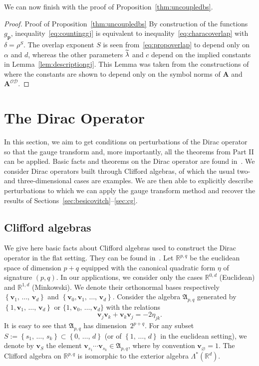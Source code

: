 \documentclass[10pt]{amsart}
\theoremstyle{definition}\newtheorem{defi}[theo]{Definition}\newtheorem{rema}[theo]{Remark}\newtheorem{exam}[theo]{Example}\newtheorem{nota}[theo]{Notation}
\newcommand{\R}{\mathbb R}
\newcommand{\CD}{\mathcal{D}}
\newcommand{\CO}{\mathcal{O}}
\newcommand{\BA}{\mathbf A}
\newcommand{\bp}{\mathbf p}
\newcommand{\bv}{\mathbf v}
\newcommand{\FA}{\mathfrak A}
\newcommand{\set}[1]{\left\{ #1 \right\}}
\let\oldtilde\tilde
\renewcommand*{\tilde}[1]{\mathchoice{\widetilde{#1}}{\widetilde{#1}}{\oldtilde{#1}}{\oldtilde{#1}}}
\begin{document}
We can now finish with the proof of Proposition~\ref{thm:uncoupledbs}.

\begin{proof}
{Proof of Proposition~\ref{thm:uncoupledbs}}
By construction of the functions $g_\bp$, inequality~\eqref{eq:countinggj} is equivalent to inequality~\eqref{eq:characoverlap} with $\delta = \rho^S$. The overlap exponent $S$ is seen from~\eqref{eq:propoverlap} to depend only on $\alpha$ and $d$, whereas the other parameters $\tilde \lambda$ and $c$ depend on the implied constants in Lemma~\ref{lem:descriptiongj}. This Lemma was taken from the constructions of~\cite[Section~7]{ParSob2010} where the constants are shown to depend only on the symbol norms of $\BA$ and $\BA^{\CO\CD}$.
\end{proof}



\section{The Dirac Operator} \label{sec:dirac}

In this section, we aim to get conditions on perturbations of the Dirac operator so that the gauge transform and, more importantly, all the theorems from Part II can be applied. Basic facts and theorems on the Dirac operator are found in~\cite{gilbertmurray,thaller}. We consider Dirac operators built through Clifford algebras, of which the usual two- and three-dimensional cases are examples. We are then able to explicitly describe perturbations to which we can apply the gauge transform method and recover the results of Sections~\ref{sec:besicovitch}--\ref{sec:cg}.

\subsection{Clifford algebras} \label{sec:clifford}

We give here basic facts about Clifford algebras used to construct the Dirac operator in the flat setting. They can be found in~\cite[Section~7]{gilbertmurray}. Let $\R^{p,q}$ be the euclidean space of dimension $p+q$ equipped with the canonical quadratic form $\eta$ of signature $(p,q)$. In our applications, we consider only the cases $\R^{0,d}$ (Euclidean) and $\R^{1,d}$ (Minkowski). We denote their orthonormal bases respectively $\set{\bv_1,\,\dotsc,\,\bv_d}$ and $\set{\bv_0,\bv_1,\,\dotsc,\,\bv_d}$. Consider the algebra $\FA_{p,q}$ generated by $\set{1,\bv_1,\,\dotsc,\,\bv_d}$ or $\{1,\bv_0,\,\dotsc,\bv_d\}$ with the relations
\begin{equation}\label{eq:anticommute}
\bv_j \bv_k + \bv_k \bv_j = - 2\eta_{jk}.
\end{equation}
It is easy to see that $\FA_{p,q}$ has dimension~$2^{p+q}$. For any subset $S := \set{s_1,\,\dotsc,\,s_k} \subset \set{0,\,\dotsc,\,d}$ (or of $\set{1,\,\dotsc,\,d}$ in the euclidean setting), we denote by $\bv_S$ the element $\bv_{s_1} \cdots \bv_{s_k} \in \FA_{p,q}$, where by convention $\bv_\varnothing = 1$. The Clifford algebra on $\R^{p,q}$ is isomorphic to the exterior algebra $\Lambda^*(\R^d)$.
\end{document}
